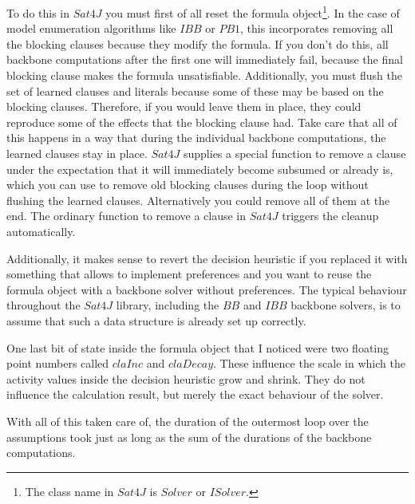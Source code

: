 To do this in $Sat4J$ you must first of all reset the formula object\footnote{The class name in $Sat4J$ is $Solver$ or $ISolver$.}. In the case of model enumeration algorithms like $IBB$ or $PB1$, this incorporates removing all the blocking clauses because they modify the formula. If you don't do this, all backbone computations after the first one will immediately fail, because the final blocking clause makes the formula unsatisfiable. Additionally, you must flush the set of learned clauses and literals because some of these may be based on the blocking clauses. Therefore, if you would leave them in place, they could reproduce some of the effects that the blocking clause had. Take care that all of this happens in a way that during the individual backbone computations, the learned clauses stay in place. $Sat4J$ supplies a special function to remove a clause under the expectation that it will immediately become subsumed or already is, which you can use to remove old blocking clauses during the loop without flushing the learned clauses. Alternatively you could remove all of them at the end. The ordinary function to remove a clause in $Sat4J$ triggers the cleanup automatically. 

Additionally, it makes sense to revert the decision heuristic if you replaced it with something that allows to implement preferences and you want to reuse the formula object with a backbone solver without preferences. The typical behaviour throughout the $Sat4J$ library, including the $BB$ and $IBB$ backbone solvers, is to assume that such a data structure is already set up correctly.

One last bit of state inside the formula object that I noticed were two floating point numbers called $claInc$ and $claDecay$. These influence the scale in which the activity values inside the decision heuristic grow and shrink. They do not influence the calculation result, but merely the exact behaviour of the solver.

With all of this taken care of, the duration of the outermost loop over the assumptions took just as long as the sum of the durations of the backbone computations.